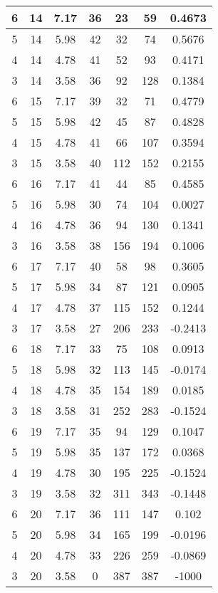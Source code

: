 \documentclass[letterpaper, 12pt]{article}
\begin{document}
\begin{longtable}{|c|c|c|c|c|c|c|}
\hline
6 & 14 & 7.17 & 36 & 23 & 59 & 0.4673 \\
\hline
5 & 14 & 5.98 & 42 & 32 & 74 & 0.5676 \\
\hline
4 & 14 & 4.78 & 41 & 52 & 93 & 0.4171 \\
\hline
3 & 14 & 3.58 & 36 & 92 & 128 & 0.1384 \\
\hline
6 & 15 & 7.17 & 39 & 32 & 71 & 0.4779 \\
\hline
5 & 15 & 5.98 & 42 & 45 & 87 & 0.4828 \\
\hline
4 & 15 & 4.78 & 41 & 66 & 107 & 0.3594 \\
\hline
3 & 15 & 3.58 & 40 & 112 & 152 & 0.2155 \\
\hline
6 & 16 & 7.17 & 41 & 44 & 85 & 0.4585 \\
\hline
5 & 16 & 5.98 & 30 & 74 & 104 & 0.0027 \\
\hline
4 & 16 & 4.78 & 36 & 94 & 130 & 0.1341 \\
\hline
3 & 16 & 3.58 & 38 & 156 & 194 & 0.1006 \\
\hline
6 & 17 & 7.17 & 40 & 58 & 98 & 0.3605 \\
\hline
5 & 17 & 5.98 & 34 & 87 & 121 & 0.0905 \\
\hline
4 & 17 & 4.78 & 37 & 115 & 152 & 0.1244 \\
\hline
3 & 17 & 3.58 & 27 & 206 & 233 & -0.2413 \\
\hline
6 & 18 & 7.17 & 33 & 75 & 108 & 0.0913 \\
\hline
5 & 18 & 5.98 & 32 & 113 & 145 & -0.0174 \\
\hline
4 & 18 & 4.78 & 35 & 154 & 189 & 0.0185 \\
\hline
3 & 18 & 3.58 & 31 & 252 & 283 & -0.1524 \\
\hline
6 & 19 & 7.17 & 35 & 94 & 129 & 0.1047 \\
\hline
5 & 19 & 5.98 & 35 & 137 & 172 & 0.0368 \\
\hline
4 & 19 & 4.78 & 30 & 195 & 225 & -0.1524 \\
\hline
3 & 19 & 3.58 & 32 & 311 & 343 & -0.1448 \\
\hline
6 & 20 & 7.17 & 36 & 111 & 147 & 0.102 \\
\hline
5 & 20 & 5.98 & 34 & 165 & 199 & -0.0196 \\
\hline
4 & 20 & 4.78 & 33 & 226 & 259 & -0.0869 \\
\hline
3 & 20 & 3.58 & 0 & 387 & 387 & -1000 \\
\hline
\end{longtable}
\end{document}
